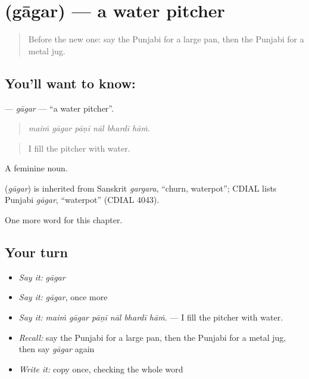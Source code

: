 \section[\texorpdfstring{\pa{ਗਾਗਰ} (gāgar)}{ਗਾਗਰ (gāgar)}]{ (gāgar) — a water pitcher}

\label{lesson:PA-C250-gagar}



\begin{quote}
Before the new one: say the Punjabi for a large pan, then the Punjabi for a metal jug.
\end{quote}

\subsection*{You'll want to know: }
\textbf{} — \emph{gāgar} — \textquotedblleft{}a water pitcher\textquotedblright{}.

\begin{quote}
     
\end{quote}

\begin{quote}
\emph{maiṁ gāgar pāṇī nāl bhardī hāṁ.}
\end{quote}

\begin{quote}
I fill the pitcher with water.
\end{quote}

A feminine noun.

\begin{cousinweb}
\textbf{} (\emph{gāgar}) is inherited from Sanskrit \emph{gargara}, \textquotedblleft{}churn, waterpot\textquotedblright{}; CDIAL lists Punjabi \emph{gāgar}, \textquotedblleft{}waterpot\textquotedblright{} (CDIAL 4043).
\end{cousinweb}

\begin{grammarlens}[title={What you've built}]
One more word for this chapter.
\end{grammarlens}

\subsection*{Your turn}
\begin{itemize}
\raggedright
  \item \emph{Say it:} \emph{gāgar}
  \item \emph{Say it:} \emph{gāgar}, once more
  \item \emph{Say it:} \emph{maiṁ gāgar pāṇī nāl bhardī hāṁ.} — I fill the pitcher with water.
  \item \emph{Recall:} say the Punjabi for a large pan, then the Punjabi for a metal jug, then say \emph{gāgar} again
  \item \emph{Write it:} copy \textbf{} once, checking the whole word
\end{itemize}

